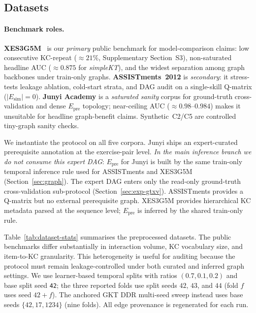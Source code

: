 \documentclass[pdflatex,sn-mathphys-num]{sn-jnl}
\newcommand{\Epre}{\ensuremath{E_{\text{pre}}}}
\newcommand{\Esim}{\ensuremath{E_{\text{sim}}}}
\newcommand{\DDR}{\textsc{DDR}}
\begin{document}
\subsection{Datasets}
\label{sec:datasets}
\paragraph{Benchmark roles.}
\textbf{XES3G5M}~\cite{xes3g5m2023} is our \emph{primary} public benchmark for
model-comparison claims: low consecutive KC-repeat (${\approx}21\%$,
Supplementary Section~S3), non-saturated headline AUC (${\approx}0.875$ for
\textit{simpleKT}), and the widest separation among graph backbones under
train-only graphs. \textbf{ASSISTments~2012} is \emph{secondary}: it
stress-tests leakage ablation, cold-start strata, and DAG audit on a
single-skill Q-matrix ($|\Esim|{=}0$). \textbf{Junyi Academy}
\cite{junyi_dataset} is a \emph{saturated sanity} corpus for ground-truth
cross-validation and dense $\Epre$ topology; near-ceiling AUC
(${\approx}0.98$--$0.984$) makes it unsuitable for headline graph-benefit
claims. Synthetic~C2/C5 are controlled tiny-graph sanity checks.

We instantiate the protocol on all five corpora. Junyi ships an
expert-curated prerequisite annotation at the exercise-pair level.
\emph{In the main inference branch we do not consume this expert DAG}:
$\Epre$ for Junyi is built by the same train-only temporal inference rule
used for ASSISTments and XES3G5M (Section~\ref{sec:graph}). The expert DAG
enters only the read-only ground-truth cross-validation sub-protocol
(Section~\ref{sec:exp-gtxv}). ASSISTments provides a Q-matrix but no
external prerequisite graph. XES3G5M provides hierarchical KC metadata parsed
at the sequence level; $\Epre$ is inferred by the shared train-only rule.

Table~\ref{tab:dataset-stats} summarises the preprocessed datasets.
The public benchmarks differ substantially in interaction volume, KC
vocabulary size, and item-to-KC granularity. This heterogeneity is
useful for auditing because the protocol must remain leakage-controlled
under both curated and inferred graph settings. We use learner-based
temporal splits with ratios $(0.7,0.1,0.2)$ and base split seed
\texttt{42}; the three reported folds use split seeds $42$, $43$, and
$44$ (fold $f$ uses seed $42{+}f$). The anchored GKT \DDR{} multi-seed
sweep instead uses base seeds $\{42,17,1234\}$ (nine folds). All edge
provenance is regenerated for each run.
\end{document}
